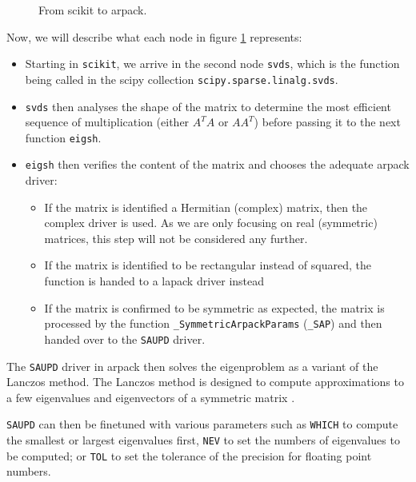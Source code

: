 \renewcommand{\tikzscale}{0.65}
\begin{figure}[h]
	\centering
	
	\captionsetup{justification=centering}
	\vspace*{5mm}
	\caption{From scikit to \acrshort{arpack}.}
	\label{fig:scikitToARPACK}
\end{figure}
\bigskip


Now, we will describe what each node in figure \ref{fig:scikitToARPACK} represents:
\begin{itemize}
	\item Starting in \texttt{scikit}, we arrive in the second node \texttt{svds}, which is the function being called in the \gls{scipy} collection \texttt{scipy.sparse.linalg.svds}.
	\item \texttt{svds} then analyses the shape of the matrix to determine the most efficient sequence of multiplication (either $A^TA$ or $AA^T$) before passing it to the next function \texttt{eigsh}.
	\item \texttt{eigsh} then verifies the content of the matrix and chooses the adequate \acrshort{arpack} driver:
	\begin{itemize}
		\item If the matrix is identified a Hermitian (complex) matrix, then the complex driver is used. As we are only focusing on real (symmetric) matrices, this step will not be considered any further.
		\item If the matrix is identified to be rectangular instead of squared, the function is handed to a \acrshort{lapack} driver instead
		\item If the matrix is confirmed to be symmetric as expected, the matrix is processed by the function \texttt{\_SymmetricArpackParams} (\texttt{\_SAP}) and then handed over to the \texttt{SAUPD} driver.
	\end{itemize}
\end{itemize}

The \texttt{SAUPD} driver in \acrshort{arpack} then solves the eigenproblem as a variant of the Lanczos method.
The Lanczos method is designed to compute approximations to a few eigenvalues and eigenvectors of a symmetric matrix \cite{lehoucq1998arpack}.

\texttt{SAUPD} can then be finetuned with various parameters such as \texttt{WHICH} to compute the smallest or largest eigenvalues first, \texttt{NEV} to set the numbers of eigenvalues to be computed; or \texttt{TOL} to set the tolerance of the precision for floating point numbers.
\bigskip


